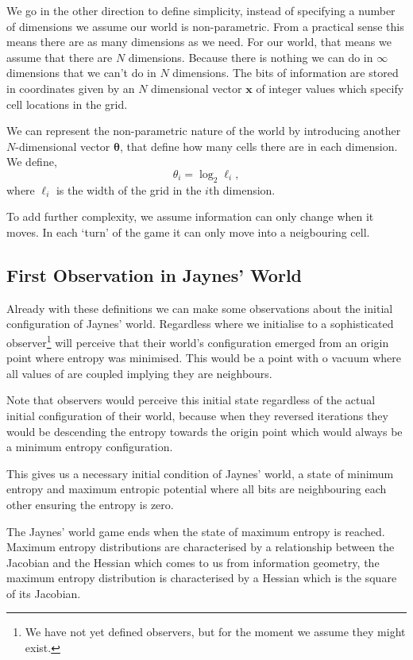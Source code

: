 \documentclass[11pt,a4paper]{article}
\begin{document}
We go in the other direction to define simplicity, instead of specifying a number of dimensions we assume our world is non-parametric. From a practical sense this means there are as many dimensions as we need. For our world, that means we assume that there are $N$ dimensions. Because there is nothing we can do in $\infty$ dimensions that we can't do in $N$ dimensions.  The bits of information are stored in coordinates given by an $N$ dimensional vector $\mathbf{x}$ of integer values which specify cell locations in the grid.

We can represent the non-parametric nature of the world by introducing another $N$-dimensional vector $\boldsymbol{\theta}$, that define how many cells there are in each dimension. We define,
\[
\theta_i = \log_2 \ell_i,
\]
where $\ell_i$ is the width of the grid in the $i$th dimension. 

To add further complexity, we assume information can only change when it moves. In each `turn' of the game it can only move into a neigbouring cell.  

\subsection{First Observation in Jaynes' World}

Already with these definitions we can make some observations about the initial configuration of Jaynes' world. Regardless where we initialise to a sophisticated observer\footnote{We have not yet defined observers, but for the moment we assume they might exist.} will perceive that their world's configuration emerged from an origin point where entropy was minimised. This would be a point with o vacuum where all values of  are coupled implying they are neighbours. 

Note that observers would perceive this initial state regardless of the actual initial configuration of their world, because when they reversed iterations they would be descending the entropy towards the origin point which would always be a minimum entropy configuration. 

This gives us a necessary initial condition of Jaynes' world, a state of minimum entropy and maximum entropic potential where all bits are neighbouring each other ensuring the entropy is zero.

The Jaynes' world game ends when the state of maximum entropy is reached. Maximum entropy distributions are characterised by a relationship between the Jacobian and the Hessian which comes to us from information geometry, the maximum entropy distribution is characterised by a Hessian which is the square of its Jacobian. 
\end{document}

